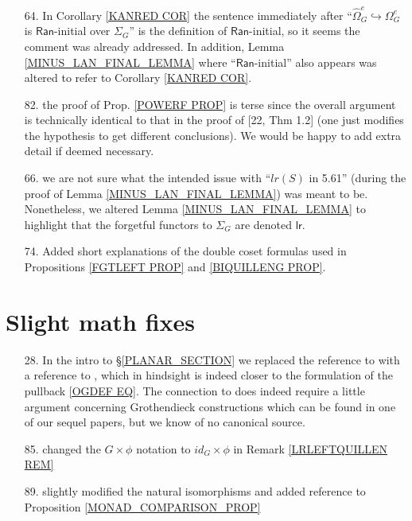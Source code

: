 \documentclass{article}
\begin{document}
\begin{itemize}
	\item[64.]
	In Corollary \ref{KANRED COR} the sentence immediately after ``$\widehat{\Omega}^e_G \hookrightarrow \Omega^e_G$ is
	$\mathsf{Ran}$-initial over $\Sigma_G$''
	is the definition of $\mathsf{Ran}$-initial,
	so it seems the comment was already addressed.
	In addition, Lemma \ref{MINUS_LAN_FINAL_LEMMA} where ``$\mathsf{Ran}$-initial'' also appears was altered to refer to Corollary \ref{KANRED COR}.
	\item[82.] the proof of Prop. \ref{POWERF PROP} is terse since the overall argument is technically identical to that in the proof of [22, Thm 1.2] (one just modifies the hypothesis to get different conclusions).
	We would be happy to add extra detail if deemed necessary. 

	\item[66.] we are not sure what the intended issue with 
	``$lr(S)$ in 5.61'' 
	(during the proof of Lemma \ref{MINUS_LAN_FINAL_LEMMA})
	was meant to be.
	Nonetheless, we altered 
	Lemma \ref{MINUS_LAN_FINAL_LEMMA}
	to highlight that the forgetful functors to $\Sigma_G$
	are denoted $\mathsf{lr}$.

	\item[74.] Added short explanations of the double coset formulas used in 
	Propositions \ref{FGTLEFT PROP} and \ref{BIQUILLENG PROP}.
\end{itemize} 

\section{Slight math fixes}

\begin{itemize}
	\item[28.] In the intro to \S \ref{PLANAR_SECTION}
	we replaced the reference to 
	\cite[Prop. 5.47]{Pe17}
	with a reference to 
	\cite[Def. 5.44]{Pe17},
	which in hindsight is indeed closer 
	to the formulation of the pullback \eqref{OGDEF EQ}.
	The connection to \cite[Prop. 5.47]{Pe17}
	does indeed require a little argument concerning Grothendieck constructions {\color{red} which can be found in one of our sequel papers}, 
	but we know of no canonical source.
	
	\item[85.] changed the $G \times \phi$ notation 
	to $id_G \times \phi$ in Remark \ref{LRLEFTQUILLEN REM}
	
	\item[89.] slightly modified the natural isomorphisms and added reference to Proposition \ref{MONAD_COMPARISON_PROP} 
\end{itemize}
\end{document}
